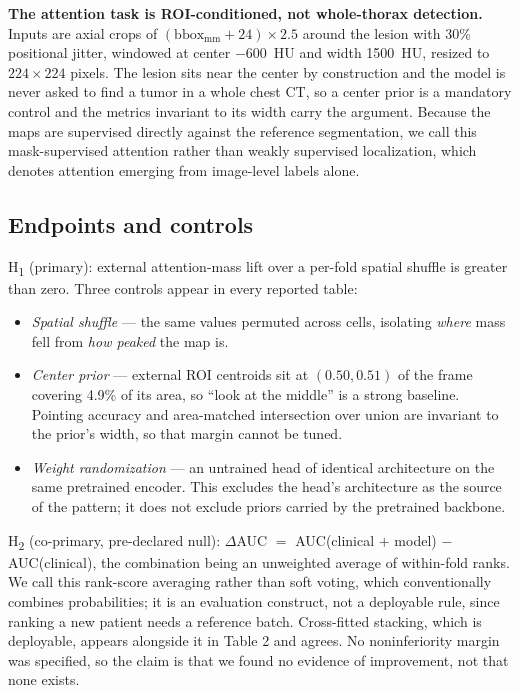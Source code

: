 \documentclass[11pt]{article}
\begin{document}
\textbf{The attention task is ROI-conditioned, not whole-thorax detection.}
Inputs are axial crops of $(\text{bbox}_{\text{mm}} + 24)\times 2.5$ around the
lesion with 30\% positional jitter, windowed at center $-600$~HU and width
1500~HU, resized to $224\times224$ pixels. The lesion sits near the center by
construction and the model is never asked to find a tumor in a whole chest CT, so
a center prior is a mandatory control and the metrics invariant to its width carry
the argument. Because the maps are supervised directly against the reference
segmentation, we call this mask-supervised attention rather than weakly supervised
localization, which denotes attention emerging from image-level labels alone.

\subsection*{Endpoints and controls}

H\textsubscript{1} (primary): external attention-mass lift over a per-fold spatial
shuffle is greater than zero. Three controls appear in every reported table:

\begin{itemize}\itemsep0pt
  \item \textit{Spatial shuffle} --- the same values permuted across cells,
    isolating \textit{where} mass fell from \textit{how peaked} the map is.
  \item \textit{Center prior} --- external ROI centroids sit at $(0.50, 0.51)$ of
    the frame covering 4.9\% of its area, so ``look at the middle'' is a strong
    baseline. Pointing accuracy and area-matched intersection over union are
    invariant to the prior's width, so that margin cannot be tuned.
  \item \textit{Weight randomization} --- an untrained head of identical
    architecture on the same pretrained encoder. This excludes the head's
    architecture as the source of the pattern; it does not exclude priors carried
    by the pretrained backbone.
\end{itemize}

H\textsubscript{2} (co-primary, pre-declared null): $\Delta$AUC $=$
AUC(clinical $+$ model) $-$ AUC(clinical), the combination being an unweighted
average of within-fold ranks. We call this rank-score averaging rather than soft
voting, which conventionally combines probabilities; it is an evaluation construct,
not a deployable rule, since ranking a new patient needs a reference batch.
Cross-fitted stacking, which is deployable, appears alongside it in Table 2 and
agrees. No noninferiority margin was specified, so the claim is that we found no
evidence of improvement, not that none exists.
\end{document}

